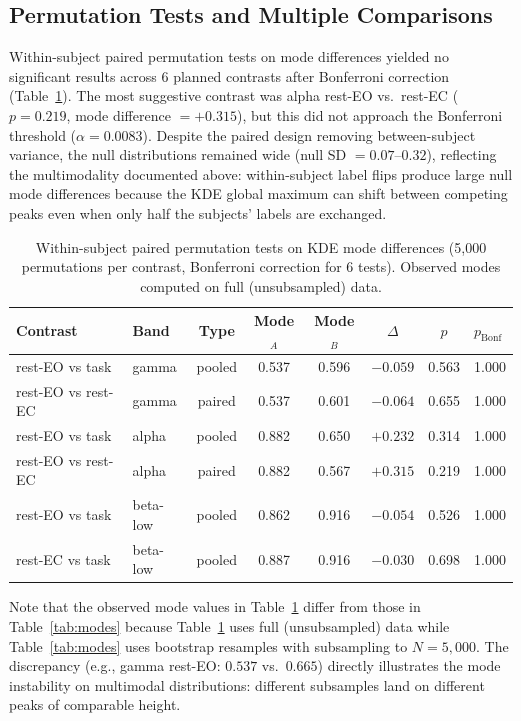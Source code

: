 \documentclass[11pt,a4paper]{article}
\begin{document}
\subsection{Permutation Tests and Multiple Comparisons}
\label{sec:fdr}

Within-subject paired permutation tests on mode differences yielded no significant results across 6 planned contrasts after Bonferroni correction (Table~\ref{tab:perms}). The most suggestive contrast was alpha rest-EO vs.\ rest-EC ($p = 0.219$, mode difference $= +0.315$), but this did not approach the Bonferroni threshold ($\alpha = 0.0083$). Despite the paired design removing between-subject variance, the null distributions remained wide (null SD $= 0.07$--$0.32$), reflecting the multimodality documented above: within-subject label flips produce large null mode differences because the KDE global maximum can shift between competing peaks even when only half the subjects' labels are exchanged.

\begin{table}[H]
\centering
\caption{Within-subject paired permutation tests on KDE mode differences (5,000 permutations per contrast, Bonferroni correction for 6 tests). Observed modes computed on full (unsubsampled) data.}
\label{tab:perms}
\begin{tabular}{@{}llcccccl@{}}
\toprule
Contrast & Band & Type & Mode$_A$ & Mode$_B$ & $\Delta$ & $p$ & $p_{\text{Bonf}}$ \\
\midrule
rest-EO vs task    & gamma    & pooled & 0.537 & 0.596 & $-0.059$ & 0.563 & 1.000 \\
rest-EO vs rest-EC & gamma    & paired & 0.537 & 0.601 & $-0.064$ & 0.655 & 1.000 \\
rest-EO vs task    & alpha    & pooled & 0.882 & 0.650 & $+0.232$ & 0.314 & 1.000 \\
rest-EO vs rest-EC & alpha    & paired & 0.882 & 0.567 & $+0.315$ & 0.219 & 1.000 \\
rest-EO vs task    & beta-low & pooled & 0.862 & 0.916 & $-0.054$ & 0.526 & 1.000 \\
rest-EC vs task    & beta-low & pooled & 0.887 & 0.916 & $-0.030$ & 0.698 & 1.000 \\
\bottomrule
\end{tabular}
\end{table}

Note that the observed mode values in Table~\ref{tab:perms} differ from those in Table~\ref{tab:modes} because Table~\ref{tab:perms} uses full (unsubsampled) data while Table~\ref{tab:modes} uses bootstrap resamples with subsampling to $N = 5{,}000$. The discrepancy (e.g., gamma rest-EO: $0.537$ vs.\ $0.665$) directly illustrates the mode instability on multimodal distributions: different subsamples land on different peaks of comparable height.
\end{document}
